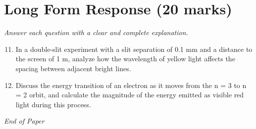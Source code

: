 \documentclass[12pt]{article}
\begin{document}
\section*{Long Form Response (20 marks)}
\textit{Answer each question with a clear and complete explanation.}
\begin{enumerate}[label=\arabic*.]
\setcounter{enumi}{10}
\item In a double-slit experiment with a slit separation of 0.1 mm and a distance to the screen of 1 m, analyze how the wavelength of yellow light affects the spacing between adjacent bright lines.
\item Discuss the energy transition of an electron as it moves from the n = 3 to n = 2 orbit, and calculate the magnitude of the energy emitted as visible red light during this process.
\end{enumerate}

\vfill
\noindent\textit{End of Paper}
\end{document}
